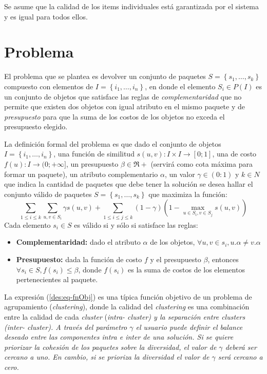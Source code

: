 Se asume que la calidad de los items individuales está garantizada por el sistema y es igual para todos ellos. 

\section{Problema}
El problema que se plantea es devolver un conjunto de paquetes $S = \left\{s_1, \ldots, s_k\right\}$ compuesto con elementos de $I=\left\{i_1,\ldots, i_n\right\}$, en donde el elemento $S_i \in P(I)$ es un conjunto de objetos que satisface las reglas de \textit{complementaridad} que no permite que existen dos objetos con igual atributo en el mismo paquete y de \textit{presupuesto} para que la suma de los costos de los objetos no exceda el presupuesto elegido.

La definición formal del problema es que dado el conjunto de objetos $I=\left\{i_1,\ldots, i_n\right\}$, una función de similitud $s(u,v): I \times I \rightarrow [0;1]$, una de costo $f(u): I \rightarrow (0;+\infty]$, un presupuesto $\beta \in \Re+$ (servirá como cota máxima para formar un paquete), un atributo complementario $\alpha$, un valor $\gamma \in (0:1)$ y $k \in N$ que indica la cantidad de paquetes que debe tener la solución se desea hallar el conjunto válido de paquetes $S = \left\{s_1, \ldots, s_k\right\}$ que maximiza la función:
\begin{equation} \label{des:eq-fnObj}
\sum_{1 \leq i \leq k}{\sum_{u,v \in S_i}{\gamma s(u,v)}} + \sum_{1 \leq i \leq j \leq k}{(1-\gamma) (1-\max_{u \in S_i, v \in S_j}{s(u,v)})}
\end{equation}
Cada elemento $s_i \in S$ es válido si y sólo si satisface las reglas:
\begin{itemize}
	\item \textbf{Complementaridad:} dado el atributo $\alpha$ de los objetos, $\forall u,v \in s_i, u.\alpha \neq v.\alpha$
	\item \textbf{Presupuesto:} dada la función de costo $f$ y el presupuesto $\beta$, entonces $\forall s_i \in S, f(s_i) \leq \beta$, donde $f(s_i)$ es la suma de costos de los elementos pertenecientes al paquete.
\end{itemize}		  

La expresión (\ref{des:eq-fnObj}) es una típica función objetivo de un problema de agrupamiento ({\em clustering}), donde la calidad del {\em clustering} es una combinación entre la calidad de cada {\em cluster} (\em{intra}- cluster) y la separación entre {\em clusters} (\em{inter}- cluster). A través del parámetro $\gamma$ el usuario puede definir el balance deseado entre las componentes intra e inter de una solución. Si se quiere priorizar la cohesión de los paquetes sobre la diversidad, el  valor de $\gamma$ deberá ser cercano a uno. En cambio, si se prioriza la diversidad el valor de $\gamma$ será cercano a cero.

